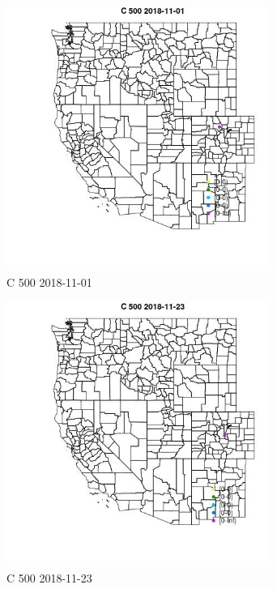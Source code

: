 \begin{figure} 
\centering  
\includegraphics[width=0.77\textwidth]{Code_Outputs/Report_ML_input_PM25_Step4_part_e_de_duplicated_aves_MapObsC_5002018-11-01.jpg} 
\caption{\label{fig:Report_ML_input_PM25_Step4_part_e_de_duplicated_avesMapObsC_5002018-11-01}C 500 2018-11-01} 
\end{figure} 
 

\begin{figure} 
\centering  
\includegraphics[width=0.77\textwidth]{Code_Outputs/Report_ML_input_PM25_Step4_part_e_de_duplicated_aves_MapObsC_5002018-11-23.jpg} 
\caption{\label{fig:Report_ML_input_PM25_Step4_part_e_de_duplicated_avesMapObsC_5002018-11-23}C 500 2018-11-23} 
\end{figure} 
 

